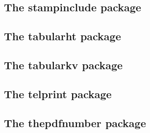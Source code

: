 \documentclass[a4paper,12pt]{article}
\makeatletter
\newcommand*{\xpackage}[1]{\textsf{#1}}
\newcommand*{\xext}[1]{\texttt{.#1}}
\newcommand*{\cs}[1]{\texttt{\textbackslash#1}}
\newcommand*{\tocinclude}[1]{%
  \setcounter{tocdepth}{3}%
  \begingroup
    \makeatletter
    \def\@prj{#1}%
    \let\contentsline\foreign@contentsline
  \endgroup
}
\def\foreign@contentsline#1#2#3#4{%
  \ifx\\#4\\%
    \csname l@#1\endcsname{#2}{#3}%
  \else
    \ifHy@linktocpage
      \csname l@#1\endcsname{{#2}}{%
        \hyper@linkfile{#3}{\@prj.pdf}{#4}%
      }%
    \else
      \csname l@#1\endcsname{%
        \hyper@linkfile{#2}{\@prj.pdf}{#4}%
      }{#3}%
    \fi
  \fi
}%
\newcommand*{\pkgsectformat}[1]{%
  \texorpdfstring{%
    \textcolor{link}{The} %
    \xpackage{#1} %
    \textcolor{link}{package}%
  }{#1}%
}
\makeatother
\begin{document}
\newpage
\subsection{\pkgsectformat{stampinclude}}
\label{stampinclude}
\begin{abstract}
The package replaces \cs{includeonly} and selects the files for
\cs{include} by inspecting the time stamp of the \xext{aux} file.
The file is selected for inclusion if the \xext{aux} file does
not yet exist or is older than the corresponding \xext{tex} file.
\end{abstract}
\tocinclude{stampinclude}

\newpage
\subsection{\pkgsectformat{tabularht}}
\label{tabularht}
\begin{abstract}
This package defines some environments that adds
a height specification to tabular and array.
\end{abstract}
\tocinclude{tabularht}

\newpage
\subsection{\pkgsectformat{tabularkv}}
\label{tabularkv}
\begin{abstract}
This package adds a key value interface for tabular
by the new environment \texttt{tabularkv}. Thus the
\TeX\ source code looks better by named parameters,
especially if package \xpackage{tabularht} is used.
\end{abstract}
\tocinclude{tabularkv}

\newpage
\subsection{\pkgsectformat{telprint}}
\label{telprint}
\begin{abstract}
Package \xpackage{telprint} provides \cs{telprint} for formatting
German phone numbers.
\end{abstract}
\tocinclude{telprint}

\newpage
\subsection{\pkgsectformat{thepdfnumber}}
\label{thepdfnumber}
\begin{abstract}
The package converts real numbers to a minimal representation
that is stripped from leading or trailing zeros,
plus signs and decimal point if not necessary.
\end{abstract}
\tocinclude{thepdfnumber}
\end{document}
